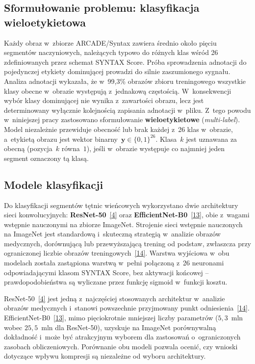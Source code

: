 \documentclass[12pt,a4paper]{article}
\newcommand{\mycite}[1]{\hyperlink{bib#1}{[#1]}}
\begin{document}
\subsection{Sformułowanie problemu: klasyfikacja wieloetykietowa}
\label{sec:multilabel}

Każdy obraz w~zbiorze ARCADE/Syntax zawiera średnio około pięciu segmentów naczyniowych, należących typowo do różnych klas wśród 26 zdefiniowanych przez schemat SYNTAX Score. Próba sprowadzenia adnotacji do pojedynczej etykiety dominującej prowadzi do silnie zaszumionego sygnału. Analiza adnotacji wykazała, że w~99{,}3\% obrazów zbioru treningowego wszystkie klasy obecne w~obrazie występują z~jednakową częstością. W~konsekwencji wybór klasy dominującej nie wynika z~zawartości obrazu, lecz jest determinowany wyłącznie kolejnością zapisania adnotacji w~pliku. Z~tego powodu w~niniejszej pracy zastosowano sformułowanie \textbf{wieloetykietowe} (\textit{multi-label}). Model niezależnie przewiduje obecność lub brak każdej z~26 klas w~obrazie, a~etykietą obrazu jest wektor binarny~$\mathbf{y} \in \{0,1\}^{26}$. Klasa~$k$ jest uznawana za obecną (pozycja~$k$ równa~$1$), jeśli w~obrazie występuje co najmniej jeden segment oznaczony tą klasą.

\subsection{Modele klasyfikacji}

Do klasyfikacji segmentów tętnic wieńcowych wykorzystano dwie architektury sieci konwolucyjnych: \textbf{ResNet-50}~\mycite{4} oraz \textbf{EfficientNet-B0}~\mycite{13}, obie z~wagami wstępnie nauczonymi na zbiorze ImageNet. Strojenie sieci wstępnie nauczonych na ImageNet jest standardową i~skuteczną strategią w~analizie obrazów medycznych, dorównującą lub przewyższającą trening od podstaw, zwłaszcza przy ograniczonej liczbie obrazów treningowych~\mycite{14}. Warstwa wyjściowa w~obu modelach została zastąpiona warstwą w~pełni połączoną z~26 neuronami odpowiadającymi klasom SYNTAX Score, bez aktywacji końcowej -- prawdopodobieństwa są wyliczane przez funkcję sigmoid w~funkcji kosztu.

ResNet-50~\mycite{4} jest jedną z~najczęściej stosowanych architektur w~analizie obrazów medycznych i~stanowi powszechnie przyjmowany punkt odniesienia~\mycite{14}. EfficientNet-B0~\mycite{13}, mimo pięciokrotnie mniejszej liczby parametrów ($5{,}3$~mln wobec $25{,}5$~mln dla ResNet-50), uzyskuje na ImageNet porównywalną dokładność i~może być atrakcyjnym wyborem dla zastosowań o~ograniczonych zasobach obliczeniowych. Porównanie obu modeli pozwala ocenić, czy wnioski dotyczące wpływu kompresji są niezależne od wyboru architektury.
\end{document}
